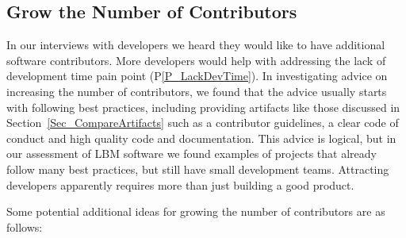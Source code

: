 \documentclass[final, 3p, times, authoryear]{elsarticle}
\newcommand{\ppref}[1]{P\ref{#1}}
\begin{document}
\subsection{Grow the Number of Contributors}

In our interviews with developers we heard they would like to have additional
software contributors.  More developers would help with addressing the lack of
development time pain point (\ppref{P_LackDevTime}).  In investigating advice on
increasing the number of contributors, we found that the advice usually starts
with following best practices, including providing artifacts like those
discussed in Section~\ref{Sec_CompareArtifacts} such as a contributor
guidelines, a clear code of conduct and high quality code and documentation.
This advice is logical, but in our assessment of LBM software we found examples
of projects that already follow many best practices, but still have small
development teams. Attracting developers apparently requires more than just
building a good product.

Some potential additional ideas for growing the number of contributors are
as follows:
\end{document}

